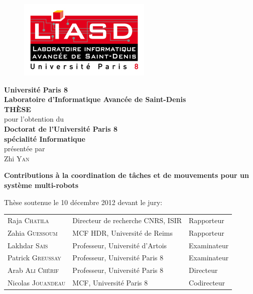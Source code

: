 \begin{titlepage}
  
  \begin{figure}
    \vspace*{-4cm}
    \hspace*{-2.2cm}
    \includegraphics[scale=0.5]{liasd.png}
    \vspace{0.8cm}
  \end{figure}
  
  \begin{center}
    \textbf{\large Université Paris 8\\}
    \textbf{\large Laboratoire d'Informatique Avancée de Saint-Denis\\}
    \bigskip
    \bigskip
    \textbf{\huge THÈSE\\}
    \bigskip
    \bigskip
    pour l’obtention du\\
    \bigskip
    \textbf{\large Doctorat de l'Université Paris 8\\}
    \textbf{\large spécialité Informatique\\}
    \bigskip
    présentée par\\
    \bigskip
    \textmd{\LARGE Zhi \textsc{Yan}\\}
    
    \textbf{\LARGE Contributions à la coordination de tâches et de mouvements pour un système multi-robots\\}
    
    \vfill
    Thèse soutenue le 10 décembre 2012 devant le jury:\\
    \bigskip
    \begin{tabular}{lll}
      Raja \textsc{Chatila}      & Directeur de recherche CNRS, ISIR & Rapporteur\\
      Zahia \textsc{Guessoum}    & MCF HDR, Université de Reims      & Rapporteur\\
      Lakhdar \textsc{Sais}      & Professeur, Université d'Artois   & Examinateur\\
      Patrick \textsc{Greussay}  & Professeur, Université Paris 8    & Examinateur\\
      Arab \textsc{Ali Chérif}   & Professeur, Université Paris 8    & Directeur\\
      Nicolas \textsc{Jouandeau} & MCF, Université Paris 8           & Codirecteur\\
    \end{tabular}
  \end{center}
\end{titlepage}
